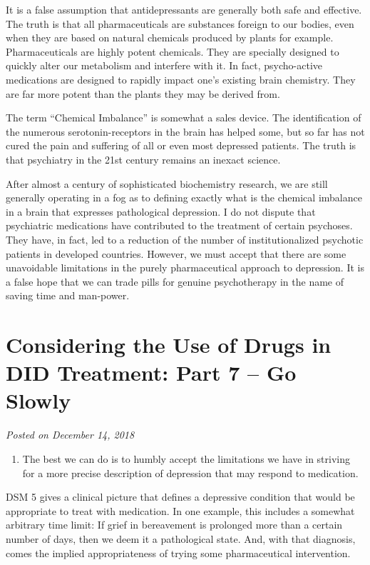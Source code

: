 \documentclass[]{book}
\providecommand{\tightlist}{%
  \setlength{\itemsep}{0pt}\setlength{\parskip}{0pt}}
\begin{document}
It is a false assumption that antidepressants are generally both safe and effective. The truth is that all pharmaceuticals are substances foreign to our bodies, even when they are based on natural chemicals produced by plants for example. Pharmaceuticals are highly potent chemicals. They are specially designed to quickly alter our metabolism and interfere with it. In fact, psycho-active medications are designed to rapidly impact one's existing brain chemistry. They are far more potent than the plants they may be derived from.

The term ``Chemical Imbalance'' is somewhat a sales device. The identification of the numerous serotonin-receptors in the brain has helped some, but so far has not cured the pain and suffering of all or even most depressed patients. The truth is that psychiatry in the 21st century remains an inexact science.

After almost a century of sophisticated biochemistry research, we are still generally operating in a fog as to defining exactly what is the chemical imbalance in a brain that expresses pathological depression. I do not dispute that psychiatric medications have contributed to the treatment of certain psychoses. They have, in fact, led to a reduction of the number of institutionalized psychotic patients in developed countries. However, we must accept that there are some unavoidable limitations in the purely pharmaceutical approach to depression. It is a false hope that we can trade pills for genuine psychotherapy in the name of saving time and man-power.

\hypertarget{considering-the-use-of-drugs-in-did-treatment-part-7-go-slowly}{%
\section{Considering the Use of Drugs in DID Treatment: Part 7 -- Go Slowly}\label{considering-the-use-of-drugs-in-did-treatment-part-7-go-slowly}}

\emph{Posted on December 14, 2018}

\begin{enumerate}
\def\labelenumi{\arabic{enumi}.}
\setcounter{enumi}{5}
\tightlist
\item
  The best we can do is to humbly accept the limitations we have in striving for a more precise description of depression that may respond to medication.
\end{enumerate}

DSM 5 gives a clinical picture that defines a depressive condition that would be appropriate to treat with medication. In one example, this includes a somewhat arbitrary time limit: If grief in bereavement is prolonged more than a certain number of days, then we deem it a pathological state. And, with that diagnosis, comes the implied appropriateness of trying some pharmaceutical intervention.
\end{document}
